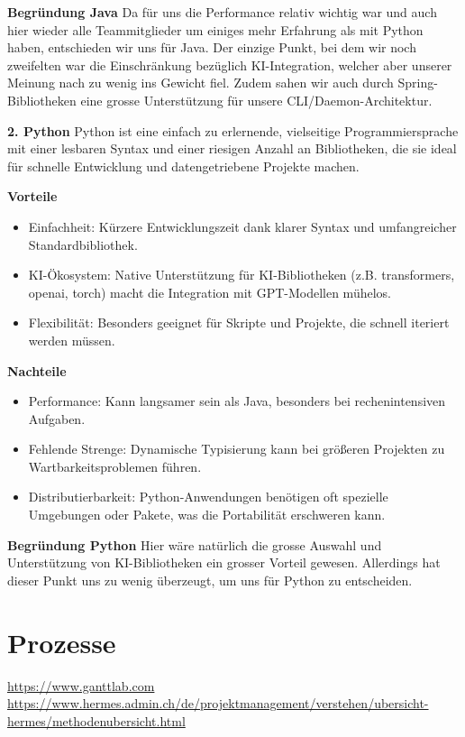 \documentclass[a4paper,12pt]{report}
\begin{document}
    \textbf{Begründung Java} Da für uns die Performance relativ wichtig war und auch hier wieder alle
    Teammitglieder um einiges mehr Erfahrung als mit Python haben, entschieden wir uns für Java.
    Der einzige Punkt, bei dem wir noch zweifelten war die Einschränkung bezüglich KI-Integration,
    welcher aber unserer Meinung nach zu wenig ins Gewicht fiel.
    Zudem sahen wir auch durch Spring-Bibliotheken eine grosse Unterstützung für unsere CLI/Daemon-Architektur.

    \textbf{2. Python}
    Python ist eine einfach zu erlernende, vielseitige Programmiersprache mit einer lesbaren Syntax
    und einer riesigen Anzahl an Bibliotheken, die sie ideal für schnelle Entwicklung
    und datengetriebene Projekte machen.

    \textbf{Vorteile}
    \begin{itemize}
        \item Einfachheit: Kürzere Entwicklungszeit dank klarer Syntax und umfangreicher Standardbibliothek.
        \item KI-Ökosystem: Native Unterstützung für KI-Bibliotheken (z.B. transformers, openai, torch) macht die Integration mit GPT-Modellen mühelos.
        \item Flexibilität: Besonders geeignet für Skripte und Projekte, die schnell iteriert werden müssen.
    \end{itemize}

    \textbf{Nachteile}
    \begin{itemize}
        \item Performance: Kann langsamer sein als Java, besonders bei rechenintensiven Aufgaben.
        \item Fehlende Strenge: Dynamische Typisierung kann bei größeren Projekten zu Wartbarkeitsproblemen führen.
        \item Distributierbarkeit: Python-Anwendungen benötigen oft spezielle Umgebungen oder Pakete, was die Portabilität erschweren kann.
    \end{itemize}

    \textbf{Begründung Python} Hier wäre natürlich die grosse Auswahl und Unterstützung von KI-Bibliotheken ein grosser Vorteil gewesen.
    Allerdings hat dieser Punkt uns zu wenig überzeugt, um uns für Python zu entscheiden.


    \section{Prozesse}
    \url{https://www.ganttlab.com} \\
    \url{https://www.hermes.admin.ch/de/projektmanagement/verstehen/ubersicht-hermes/methodenubersicht.html}
\end{document}
